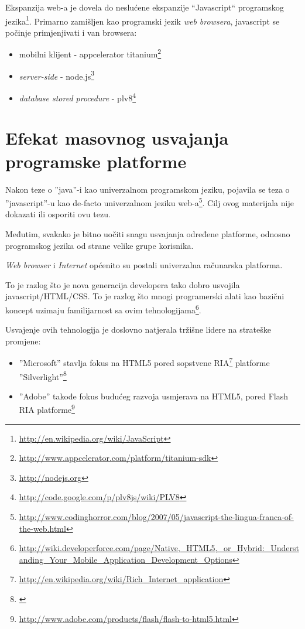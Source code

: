 \documentclass[times, utf8, seminar]{fit}
\begin{document}
Ekspanzija web-a je dovela do neslućene ekspanzije ``Javascript`` programskog jezika\footnote{\url{http://en.wikipedia.org/wiki/JavaScript}}. Primarno zamišljen kao programski jezik \emph{web browsera}, javascript se počinje primjenjivati i van browsera:
\begin{itemize}
  \item mobilni klijent - appcelerator titanium\footnote{\url{http://www.appcelerator.com/platform/titanium-sdk}}
  \item \emph{server-side} - node.js\footnote{\url{http://nodejs.org}}
  \item \emph{database stored procedure} - plv8\footnote{\url{http://code.google.com/p/plv8js/wiki/PLV8}}
\end{itemize}
 

\section{Efekat masovnog usvajanja programske platforme}

Nakon teze o ''java''-i kao univerzalnom programskom jeziku, pojavila se teza o ''javascript''-u kao de-facto univerzalnom jeziku web-a\footnote{\url{http://www.codinghorror.com/blog/2007/05/javascript-the-lingua-franca-of-the-web.html}}. Cilj ovog materijala nije dokazati ili osporiti ovu tezu.

Međutim, svakako je bitno uočiti snagu usvajanja određene platforme, odnosno programskog jezika od strane velike grupe korisnika. 

\emph{Web browser} i \emph{Internet} općenito su postali univerzalna računarska platforma. 

To je razlog što je nova generacija developera tako dobro usvojila javascript/HTML/CSS. To je razlog što mnogi programerski alati kao bazični koncept uzimaju familijarnost sa ovim tehnologijama\footnote{\url{http://wiki.developerforce.com/page/Native,_HTML5,_or_Hybrid:_Understanding_Your_Mobile_Application_Development_Options}}.

Usvajenje ovih tehnologija je doslovno natjerala tržišne lidere na strateške promjene:
\begin{itemize}
  \item ''Microsoft'' stavlja fokus na HTML5 pored sopstvene RIA\footnote{\url{http://en.wikipedia.org/wiki/Rich_Internet_application}} platforme ''Silverlight''\footnote{\href{http://www.technologyreview.com/view/426083/html5-triumphant-silverlight-flash-discontinuing}{\color{blue}{Trijumf HTML5 nad zatvorenim vendorskim tehnologijama}}}
  \item ''Adobe'' takođe fokus budućeg razvoja usmjerava na HTML5, pored Flash RIA platforme\footnote{\url{http://www.adobe.com/products/flash/flash-to-html5.html}}
\end{itemize}
\end{document}
